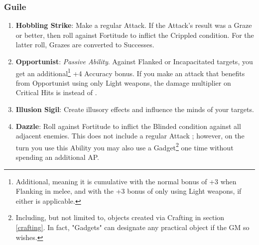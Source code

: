 \subsubsection{Guile}
\begin{enumerate}
    \item \textbf{Hobbling Strike}: Make a regular Attack. If the Attack's result was a Graze or better, then roll against Fortitude to inflict the Crippled condition. For the latter roll, Grazes are converted to Successes.
    \item \textbf{Opportunist}: \textit{Passive Ability}. Against Flanked or Incapacitated targets, you get an additional\footnote{Additional, meaning it is cumulative with the normal bonus of +3 when Flanking in melee, and with the +3 bonus of only using Light weapons, if either is applicable.} +4 Accuracy bonus. If you make an attack that benefits from Opportunist using only Light weapons, the damage multiplier on Critical Hits is  instead of .
    \item \textbf{Illusion Sigil}: Create illusory effects and influence the minds of your targets.
    \item \textbf{Dazzle}: Roll against Fortitude to inflict the Blinded condition against all adjacent enemies. This does not include a regular Attack ; however, on the turn you use this Ability you may also use a Gadget\footnote{Including, but not limited to, objects created via Crafting in section \ref{crafting}. In fact, "Gadgets" can designate any practical object if the GM so wishes.} one time without spending an additional AP.
\end{enumerate}

